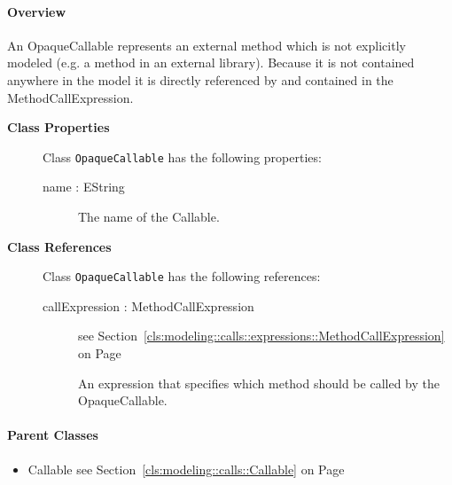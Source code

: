 \paragraph{Overview}

	
			
An OpaqueCallable represents an external method which is not explicitly modeled (e.g. a method in an external library). Because it is not contained anywhere in the model it is directly referenced by and contained in the MethodCallExpression.	
			
	
		
	


\begin{description}

	\item[\textbf{Class Properties}] Class \texttt{OpaqueCallable} has the following properties:
	\begin{description}
\item[name : EString 	]

\hspace{\fill}
\nopagebreak


	
			
The name of the Callable.	
		
	
	\end{description}
	
	\item[\textbf{Class References}] Class \texttt{OpaqueCallable} has the following references:
	\begin{description}
\item[callExpression : MethodCallExpression 	]
see Section~\ref{cls:modeling::calls::expressions::MethodCallExpression} on Page~\pageref{cls:modeling::calls::expressions::MethodCallExpression}
\hspace{\fill}
\nopagebreak


	
			
An expression that specifies which method should be called by the OpaqueCallable.	
		
	
	\end{description}
	

\end{description}

\paragraph{Parent Classes}
\begin{itemize}
\item Callable see Section~\ref{cls:modeling::calls::Callable} on Page~\pageref{cls:modeling::calls::Callable}\end{itemize}
